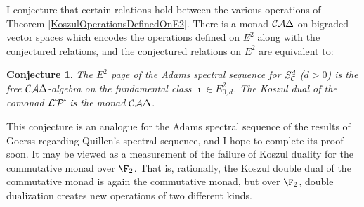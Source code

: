 \documentclass[11pt]{article}
\theoremstyle{plain}
\newtheorem{conjectureAlpha}{Conjecture}
\newcommand{\Sq}{\mathrm{Sq}}
\begin{document}
I conjecture that certain relations hold between the various operations of Theorem \ref{KoszulOperationsDefinedOnE2}. There is a monad $\mathcal{C}\mathcal{A}\Delta$ on bigraded vector spaces which encodes the operations defined on $E^2$ along with the conjectured relations, and the conjectured relations on $E^2$ are equivalent to:
\begin{conjectureAlpha}\label{E2monadConjecture}
The $E^2$ page of the Adams spectral sequence for $S^d_{\mathcal{C}}$ ($d>0$) is the free $\mathcal{C}\mathcal{A}\Delta$-algebra on the fundamental class $\imath\in E^2_{0,d}$. The Koszul dual of the comonad $\mathcal{L}\hat{\,}\mathcal{P}\hat{\,}$ is the monad $\mathcal{C}\mathcal{A}\Delta$.
\end{conjectureAlpha}
\noindent This conjecture is an analogue for the Adams spectral sequence of the results of Goerss \cite[{6.2}, {6.5}]{MR1089001} regarding Quillen's spectral sequence, and I hope to complete its proof soon. %
%
%
It may be viewed as a measurement of the failure of Koszul duality for the commutative monad over $\F_2$. That is, rationally, the Koszul double dual of the commutative monad is again the commutative monad, but over $\F_2$, double dualization creates new operations of two different kinds.
\end{document}
